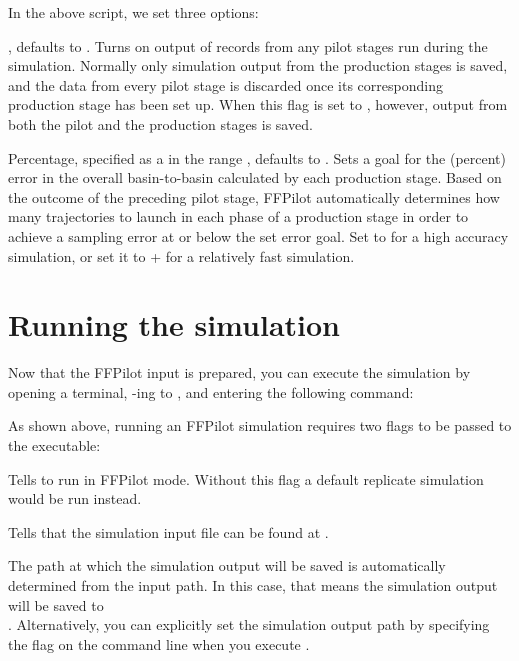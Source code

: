 {In the above script, we set three options:
\begin{description}[style=nextline]
    \item[\code{ffluxPilotOutput}] , defaults to . Turns on output of records from any pilot stages run during the simulation. Normally only simulation output from the production stages is saved, and the data from every pilot stage is discarded once its corresponding production stage has been set up. When this flag is set to , however, output from both the pilot and the production stages is saved.
    \item[\code{errorGoal}] Percentage, specified as a  in the range \code{(0-1.0]}, defaults to . Sets a goal for the (percent) error in the overall basin-to-basin  calculated by each production stage. Based on the outcome of the preceding pilot stage, FFPilot automatically determines how many trajectories to launch in each phase of a production stage in order to achieve a sampling error at or below the set error goal. Set  to  for a high accuracy simulation, or set it to + for a relatively fast simulation.
\end{description}

\section{Running the simulation}\label{sec:running_srg_mfpt}
Now that the FFPilot input is prepared, you can execute the simulation by opening a terminal, -ing to \pth{\dir}, and entering the following command:


As shown above, running an FFPilot simulation requires two flags to be passed to the  executable:
\begin{description}[style=nextline]
    \item[\code{-ffpilot}] Tells  to run in FFPilot mode. Without this flag a default replicate simulation would be run instead.
    \item[\code{-f <input-path>}] Tells  that the simulation input file can be found at .
\end{description}

The path at which the simulation output will be saved is automatically determined from the input path. In this case, that means the simulation output will be saved to\\
\pth{\outpathrel}. Alternatively, you can explicitly set the simulation output path by specifying the  flag on the command line when you execute .

}
